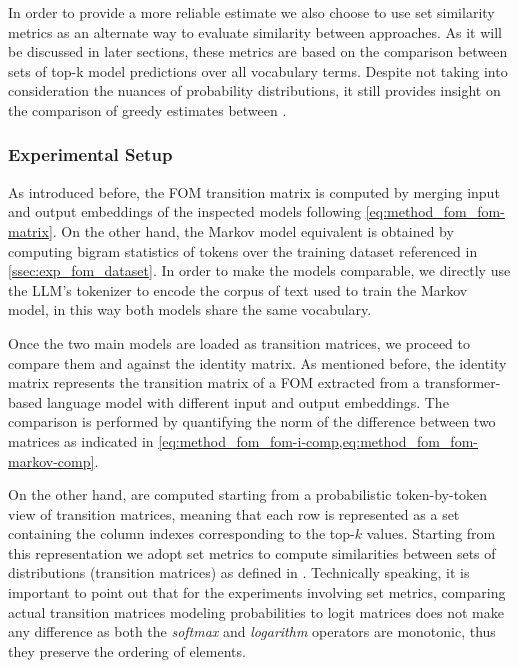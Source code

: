 In order to provide a more reliable estimate we also choose to use set similarity metrics as an alternate way to evaluate similarity between approaches.
As it will be discussed  in later sections, these metrics are based on the comparison between sets of top-k model predictions over all vocabulary terms.
Despite  not taking into consideration the nuances of probability distributions, it still provides insight on the comparison of greedy estimates between .

\subsubsection{Experimental Setup}

As introduced before, the FOM transition matrix is computed by merging input and output embeddings of the inspected models following \cref{eq:method_fom_fom-matrix}.
On the other hand, the Markov model equivalent is obtained by computing bigram statistics of tokens over the training dataset referenced in \cref{ssec:exp_fom_dataset}.
In order to make the models comparable, we directly use the LLM's tokenizer to encode the corpus of text used to train the Markov model, in this way both models share the same vocabulary.

Once the two main models are loaded as transition matrices, we proceed to compare them  and against the identity matrix.
As mentioned before, the identity matrix represents the transition matrix of a FOM extracted from a transformer-based language model with different input and output embeddings.
The comparison is performed by quantifying the norm of the difference between two matrices as indicated in \cref{eq:method_fom_fom-i-comp,eq:method_fom_fom-markov-comp}.

On the other hand,  are computed starting from a probabilistic token-by-token view of transition matrices, meaning that each row is represented as a set containing the column indexes corresponding to the top-$k$ values.
Starting from this representation we adopt set metrics to compute similarities between sets of distributions (transition matrices) as defined in . 
Technically speaking, it is important to point out that for the experiments involving set metrics, comparing actual transition matrices modeling probabilities to logit matrices does not make any difference as both the \emph{softmax} and \emph{logarithm} operators are monotonic, thus they preserve the ordering of elements.

